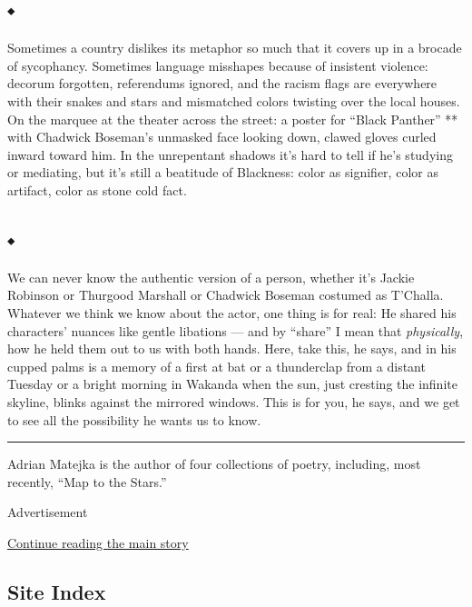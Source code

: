\hypertarget{-7}{%
\subsection{⬩}\label{-7}}

Sometimes a country dislikes its metaphor so much that it covers up in a
brocade of sycophancy. Sometimes language misshapes because of insistent
violence: decorum forgotten, referendums ignored, and the racism flags
are everywhere with their snakes and stars and mismatched colors
twisting over the local houses. On the marquee at the theater across the
street: a poster for ``Black Panther'' ** with Chadwick Boseman's
unmasked face looking down, clawed gloves curled inward toward him. In
the unrepentant shadows it's hard to tell if he's studying or mediating,
but it's still a beatitude of Blackness: color as signifier, color as
artifact, color as stone cold fact.

\hypertarget{-8}{%
\subsection{⬩}\label{-8}}

We can never know the authentic version of a person, whether it's Jackie
Robinson or Thurgood Marshall or Chadwick Boseman costumed as T'Challa.
Whatever we think we know about the actor, one thing is for real: He
shared his characters' nuances like gentle libations --- and by
``share'' I mean that \emph{physically}, how he held them out to us with
both hands. Here, take this, he says, and in his cupped palms is a
memory of a first at bat or a thunderclap from a distant Tuesday or a
bright morning in Wakanda when the sun, just cresting the infinite
skyline, blinks against the mirrored windows. This is for you, he says,
and we get to see all the possibility he wants us to know.

\begin{center}\rule{0.5\linewidth}{\linethickness}\end{center}

Adrian Matejka is the author of four collections of poetry, including,
most recently, ``Map to the Stars.''

Advertisement

\protect\hyperlink{after-bottom}{Continue reading the main story}

\hypertarget{site-index}{%
\subsection{Site Index}\label{site-index}}

